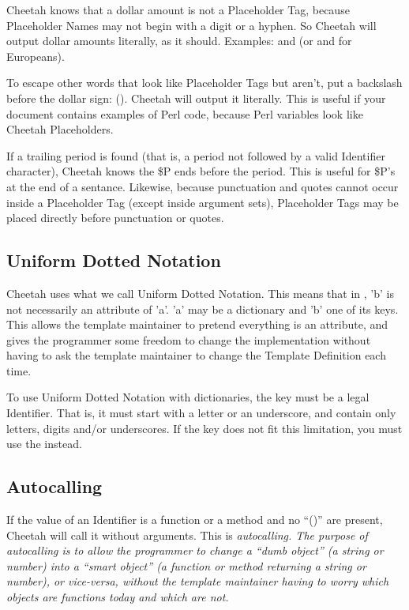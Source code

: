 Cheetah knows that a dollar amount is not a Placeholder Tag, because
Placeholder Names may not begin with a digit or a hyphen.  So Cheetah will
output dollar amounts literally, as it should.  Examples:
 and  (or  and 
for Europeans).

To escape other words that look like Placeholder Tags but aren't, put a 
backslash before the dollar sign: ().  Cheetah
will output it literally.  This is useful if your document contains examples of
Perl code, because Perl variables look like Cheetah Placeholders.

If a trailing period is found (that is, a period not followed by a valid
Identifier character), Cheetah knows the \$P ends before the
period.  This is useful for \$P's at the end of a sentance.  Likewise, because
punctuation and quotes cannot occur inside a Placeholder Tag (except inside
argument sets), Placeholder Tags may be placed directly before punctuation or
quotes.

     

\subsection{Uniform Dotted Notation}

Cheetah uses what we call Uniform Dotted Notation.  This means that in
, 'b' is not necessarily an attribute of 'a'.  'a' may be a
dictionary and 'b' one of its keys.  This allows the template maintainer to
pretend everything is an attribute, and gives the programmer some freedom to
change the implementation without having to ask the template maintainer to
change the Template Definition each time.

To use Uniform Dotted Notation with dictionaries, the key must be a legal
Identifier.  That is, it must start with a letter or an underscore, and contain
only letters, digits and/or underscores.  If the key does not fit this
limitation, you must use the  instead.


\subsection{Autocalling}

If the value of an Identifier is a function or a method and no ``()'' are
present, Cheetah will call it without arguments.  This is \em{autocalling}.
The purpose of autocalling is to allow the programmer to change a ``dumb
object'' (a string or number) into a ``smart object'' (a function or method
returning a string or number), or vice-versa, without the template maintainer
having to worry which objects are functions today and which are not.

